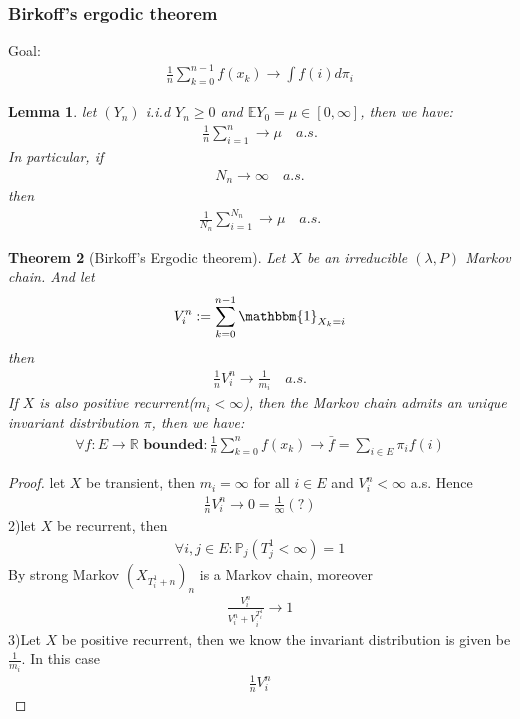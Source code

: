 \documentclass[a4paper,11pt]{book}
\newtheorem{theorem}{Theorem}[section]
\newtheorem{lemma}[theorem]{Lemma}
\theoremstyle{definition}
\theoremstyle{remark}
\begin{document}
\subsubsection*{Birkoff's ergodic theorem}
Goal:
\begin{align*}
	\frac{1}{n} \sum_{k= 0}^{n-1} f(x_k) \rightarrow \int f(i)d \pi_i
\end{align*}

\begin{lemma}
	let $(Y_n)$ i.i.d $Y_n \ge 0$ and $\mathbb{E}Y_0 = \mu \in [0, \infty]$, then we have:
	\begin{align*}
		\frac{1}{n}\sum_{i = 1}^n \rightarrow \mu \quad a.s.
	\end{align*}
	In particular, if 
	\begin{align*}
		N_n \rightarrow \infty \quad a.s.
	\end{align*}
	then 
	\begin{align*}
	\frac{1}{N_n} \sum_{i = 1}^{N_n} \rightarrow \mu \quad a.s.
	\end{align*}
\end{lemma}

\begin{theorem}[Birkoff's Ergodic theorem]
	Let $X$ be an irreducible $(\lambda, P)$ Markov chain. And let 
	\begin{align*}
		V_i^n := \sum_{k = 0}^{n -1} \mathbbm{1}_{X_k = i}
	\end{align*}
	then 
	\begin{align*}
		\frac{1}{n} V_i^n \rightarrow \frac{1}{m_i} \quad a.s.
	\end{align*}
	If $X$ is also positive recurrent($m_i < \infty$), then the Markov chain admits an unique invariant distribution $\pi$, then we have:
	\begin{align*}
		\forall f :E \rightarrow \mathbb{R} \textbf{ bounded}: \frac{1}{n} \sum_{k = 0}^n f(x_k) \rightarrow \bar{f} = \sum_{i \in E} \pi_i f(i)
	\end{align*}
\end{theorem}
\begin{proof}
	let $X$ be transient, then $m_i = \infty$ for all $i \in E$ and $V_i^n < \infty$ a.s. Hence
	\begin{align*}
		\frac{1}{n} V_i^n \rightarrow 0 = \frac{1}{\infty}(?)
	\end{align*}
	2)let $X$ be recurrent, then 
	\begin{align*}
		\forall i, j \in E :\mathbb{P}_j(T_j^1 < \infty) = 1 
	\end{align*}
	By strong Markov $(X_{T_i^1+ n})_n$ is a Markov chain, moreover
	\begin{align*}
		\frac{V_i^n}{V_i^n + V_i^{T_i^1}} \rightarrow 1
	\end{align*}
	3)Let $X$ be positive recurrent, then we know the invariant distribution is given be $\frac{1}{m_i}$. In this case 
	\begin{align*}
		\frac{1}{n} V_i^n
	\end{align*}
\end{proof}
\end{document}
